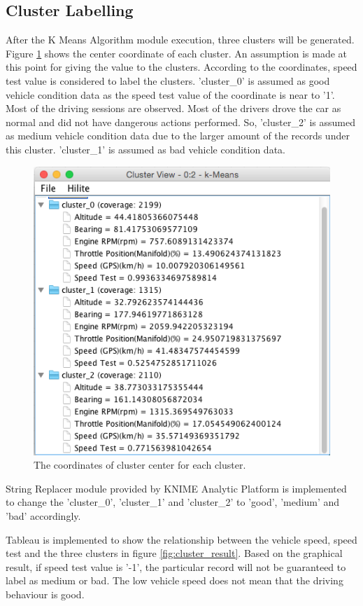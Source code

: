 \subsection{Cluster Labelling}
After the K Means Algorithm module execution, three clusters will be generated. Figure \ref{fig:cluster} shows the center coordinate of each cluster. An assumption is made at this point for giving the value to the clusters. According to the coordinates, speed test value is considered to label the clusters. 'cluster\_0' is assumed as good vehicle condition data as the speed test value of the coordinate is near to '1'. Most of the driving sessions are observed. Most of the drivers drove the car as normal and did not have dangerous actions performed. So, 'cluster\_2' is assumed as medium vehicle condition data due to the larger amount of the records under this cluster. 'cluster\_1' is assumed as bad vehicle condition data.

\begin{figure}[hbt!]\centering
\includegraphics[height=.5\textwidth]{image/cluster}
\caption{The coordinates of cluster center for each cluster.}
\label{fig:cluster}
\end{figure}


String Replacer module provided by KNIME Analytic Platform is implemented to change the 'cluster\_0', 'cluster\_1' and 'cluster\_2' to 'good', 'medium' and 'bad' accordingly.

Tableau is implemented to show the relationship between the vehicle speed, speed test and the three clusters in figure \ref{fig:cluster_result}. Based on the graphical result, if speed test value is '-1', the particular record will not be guaranteed to label as  medium or bad. The low vehicle speed does not mean that the driving behaviour is good.

